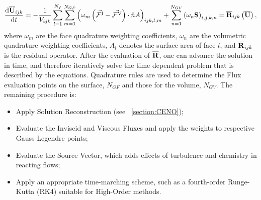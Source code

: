 \begin{equation}
\label{eqn:semi_discrete}
 \frac{\mathrm{d}\overline{\mathbf{U}}_{ijk}}{\mathrm{d}t} =
 - \frac{1}{{V}_{ijk}} \sum_{l=1}^{N_f} 
 \sum_{m=1}^{N_{GF}} \left( \omega_m \left(\vec{\mathcal{F}^{\mathrm{I}}} - 
 \vec{\mathcal{F}^{\mathrm{V}}} \right)\cdot \hat{n} {A} \right)_{ijk,l,m}
 + \sum_{n=1}^{N_{GV}} \left( \omega_n {\mathbf{S}} \right)_{i,j,k,n}
 = \overline{\mathbf{R}}_{ijk} \left( \overline{\mathbf{U}} \right),
\end{equation}
where $\omega_m$ are the face quadrature weighting coefficients, $\omega_n$ are the volumetric quadrature weighting coefficients, $A_l$ denotes the surface area of face $l$, and $\overline{\mathbf{R}}_{ijk}$ is the residual operator. After the evaluation of $\overline{\mathbf{R}}$, one can advance the solution in time, and therefore iteratively solve the time dependent problem that is described by the equations. Quadrature rules are used to determine the Flux evaluation points on the surface, $N_{GF}$ and those for the volume, $N_{GV}$. The remaining procedure is:
\begin{itemize}
 \item Apply Solution Reconstruction (see ~\ref{section:CENO});
 \item Evaluate the Inviscid and Viscous Fluxes and apply the weights to respective Gauss-Legendre points;
 \item Evaluate the Source Vector, which adds effects of turbulence and chemistry in reacting flows;
 \item Apply an appropriate time-marching scheme, such as a fourth-order Runge-Kutta (RK4) suitable for High-Order methods.
\end{itemize}

